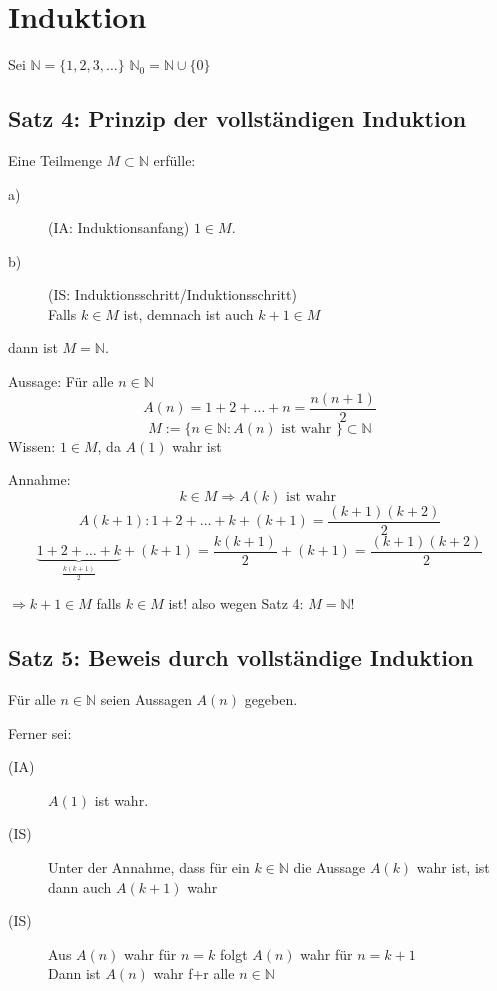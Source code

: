 \documentclass[fleqn]{scrbook}
\newenvironment{example}{{\bfseries Beispiel }}{}
\begin{document}
\section{Induktion}

Sei $\mathbb{N} = \{1,2,3,\ldots\}$
$\mathbb{N}_0=\mathbb{N} \cup \{0\}$

\subsection{Satz 4: Prinzip der vollständigen Induktion}

Eine Teilmenge $M \subset \mathbb{N}$ erfülle:

\begin{description}
 \item[a)] (IA: Induktionsanfang) $1 \in M$.
 \item[b)] (IS: Induktionsschritt/Induktionsschritt) \\
    Falls $k \in M$ ist, demnach ist auch $k+1 \in M$
\end{description}

dann ist $M = \mathbb{N}$.

\begin{example}
Aussage: Für alle $n \in \mathbb{N}$
\[A(n) = 1+2+\ldots+n = \frac{n(n+1)}{2}\]
\[M:=\{n \in \mathbb{N} : A(n) \text{ ist wahr }\} \subset \mathbb{N}\]
Wissen: $1 \in M$, da $A(1)$ wahr ist

Annahme: 
\[k \in M \Longrightarrow A(k) \text{ ist wahr }\]
\[A(k+1):1+2+\ldots+k+(k+1)= \frac{(k+1)(k+2)}{2}\]
\[\underbrace{1+2+\ldots+k}_{\frac{k(k+1)}{2}}+(k+1)= \frac{k(k+1)}{2}+(k+1)=\frac{(k+1)(k+2)}{2}\]

$\Longrightarrow k+1 \in M$ falls $k \in M$ ist! also wegen Satz 4: $M=\mathbb{N}$!
\end{example}

\subsection{Satz 5: Beweis durch vollständige Induktion}

Für alle $n \in \mathbb{N}$ seien Aussagen $A(n)$ gegeben.

Ferner sei:

\begin{description}
 \item[(IA)] $A(1)$ ist wahr.
 \item[(IS)] Unter der Annahme, dass für ein $k \in \mathbb{N}$ die Aussage $A(k)$ wahr ist, ist dann auch $A(k+1)$ wahr
 \item[(IS)] Aus $A(n)$ wahr für $n=k$ folgt $A(n)$ wahr für $n=k+1$ \\
   Dann ist $A(n)$ wahr f+r alle $n \in \mathbb{N}$
\end{description}
\end{document}
